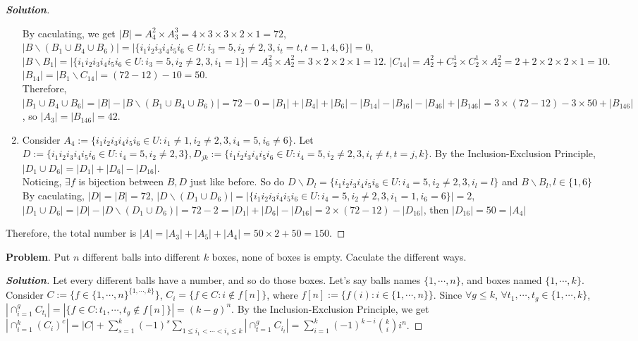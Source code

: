 \documentclass{ctexart}
\newcounter{problem}
\renewcommand{\theproblem}{\Roman{problem}}
\newenvironment{problem}{\refstepcounter{problem}\noindent\color{blue}\textbf{Problem}\theproblem.}{}
\newenvironment{solution}{\begin{proof}[\textbf{Solution}]}{\end{proof}}
\renewcommand{\(}{\left(}
\renewcommand{\)}{\right)}
\newcommand{\Cb}[2]{\binom{#1}{#2}}
\newcommand{\minus}{\mathbin{\backslash}}
\begin{document}
\begin{solution}
\begin{enumerate}
		By caculating, we get $|B|=A_{4}^2\times A_{3}^3=4\times 3\times 3\times 2\times1=72$, $|B\minus(B_1\cup B_4\cup B_6)|=|\{i_1i_2i_3i_4i_5i_6\in U: i_3=5,i_2\neq 2,3, i_t= t, t=1,4,6\}|=0$, $|B\minus B_1|=|\{i_1i_2i_3i_4i_5i_6\in U: i_3=5,i_2\neq 2,3, i_1= 1\}|=A_3^2\times A_2^2=3\times2\times2\times 1=12$. $|C_{14}|=A_2^2+C_2^1\times C_2^1\times A_2^2=2+2\times2\times2\times1=10$. $|B_{14}|=|B_{1}\minus C_{14}|=(72-12)-10=50$. \\
		Therefore, $|B_1\cup B_4\cup B_6|=|B|-|B\minus(B_1\cup B_4\cup B_6)|=72-0=|B_1|+|B_4|+|B_6|-|B_{14}|-|B_{16}|-|B_{46}|+|B_{146}|=3\times(72-12)-3\times50+|B_{146}|$, so $|A_3|=|B_{146}|=42$. 
		\item Consider $A_{4}:=\{i_1i_2i_3i_4i_5i_6\in U: i_1\neq 1, i_2\neq 2,3,i_4=5,i_6\neq 6\}$. Let $D:=\{i_1i_2i_3i_4i_5i_6\in U: i_4=5,i_2\neq 2,3 \}, D_{jk}:=\{i_1i_2i_3i_4i_5i_6\in U: i_4=5,i_2\neq 2,3, i_t\neq t, t=j,k\}.$ By the Inclusion-Exclusion Principle, $|D_1\cup D_6|=|D_1|+|D_6|-|D_{16}|$. \\
		Noticing, $\exists f$ is bijection between $B,D$ just like before. So do $D\minus D_{l}=\{i_1i_2i_3i_4i_5i_6\in U: i_4=5,i_2\neq 2,3, i_l= l\}$ and $B\minus B_{l}, l\in\{1,6\}$\\
		By caculating, $|D|=|B|=72$, $|D\minus (D_1\cup D_6)|=|\{i_1i_2i_3i_4i_5i_6\in U: i_4=5,i_2\neq 2,3, i_1= 1, i_6=6\}|=2$, $|D_1\cup D_6|=|D|-|D\minus (D_1\cup D_6)|=72-2=|D_{1}|+|D_{6}|-|D_{16}|=2\times(72-12)-|D_{16}|$, then $|D_{16}|=50=|A_4|$
		\end{enumerate}
		Therefore, the total number is $|A|=|A_3|+|A_5|+|A_4|=50\times2+50=150$.
\end{solution}


\begin{problem}
    Put $n$ different balls into different $k$ boxes, none of boxes is empty. Caculate the different ways.
\end{problem}
\begin{solution}
	\iffalse Consider $C:=\{f\in \{1,\cdots,n\}^{\{1,\cdots,k\}}\}$,  $C_i=\{f\in C: |f[n]|=i\}$, where $f[n]:=\{f(i):i\in \{1,\cdots,n\}\}$, $A_i=\{f\in \{1,\cdots,n\}^{\{1,\cdots,i\}}:|f[n]|=i\}, i\in \mathbb{N}$. So $|C|=\sum_{i=1}^k C_k^i |A_i|=n^k$.\fi
	Let every different balls have a number, and so do those boxes. Let's say balls names $\{1,\cdots,n\}$, and boxes named $\{1,\cdots,k\}$.
	Consider $C:=\{f\in \{1,\cdots,n\}^{\{1,\cdots,k\}}\}$,  $C_i=\{f\in C: i\notin f[n]\}$, where $f[n]:=\{f(i):i\in \{1,\cdots,n\}\}$. Since $\forall g\leq k$, $\forall t_1,\cdots, t_g\in \{1,\cdots,k\}$, $|\cap_{i=1}^gC_{t_i}|=|\{f\in C: t_1,\cdots, t_g\notin f[n]\}|=(k-g)^n$. By the Inclusion-Exclusion Principle, we get $|\cap_{i=1}^{k}(C_i)^c|=|C|+\sum_{s=1}^k(-1)^s\sum_{1\leq i_1<\cdots<i_s\leq k}|\cap_{t=1}^gC_{i_t}|=\sum_{i=1}^{k}(-1)^{k-i}\Cb{k}{i}i^n$.

\end{solution}
\end{document}
